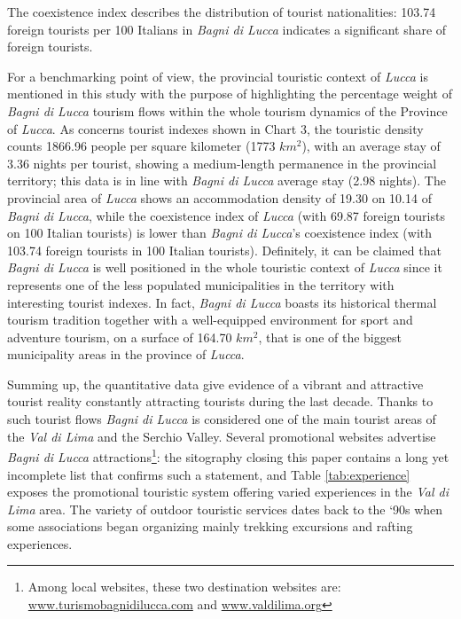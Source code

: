 \documentclass[sustainability,article,submit,pdftex,moreauthors]{Definitions/mdpi}
\begin{document}
The coexistence index describes the distribution of tourist nationalities: 103.74 foreign tourists per 100 Italians in \emph{Bagni di Lucca} indicates a significant share of foreign tourists.

For a benchmarking point of view, the provincial touristic context of \emph{Lucca} is mentioned in this study with the purpose of highlighting the percentage weight of \emph{Bagni di Lucca} tourism flows within the whole tourism dynamics of the Province of \emph{Lucca}. 
As concerns tourist indexes shown in Chart 3, the touristic density counts 1866.96 people per square kilometer (1773 $km^2$), with an average stay of 3.36 nights per tourist, showing a medium-length permanence in the provincial territory; this data is in line with \emph{Bagni di Lucca} average stay (2.98 nights). 
The provincial area of \emph{Lucca} shows an accommodation density of 19.30 on 10.14 of \emph{Bagni di Lucca}, while the coexistence index of \emph{Lucca} (with 69.87 foreign tourists on 100 Italian tourists) is lower than \emph{Bagni di Lucca}’s coexistence index (with 103.74 foreign tourists in 100 Italian tourists). 
Definitely, it can be claimed that \emph{Bagni di Lucca} is well positioned in the whole touristic context of \emph{Lucca} since it represents one of the less populated municipalities in the territory with interesting tourist indexes. In fact, \emph{Bagni di Lucca} boasts its historical thermal tourism tradition together with a well-equipped environment for sport and adventure tourism, on a surface of 164.70 $km^2$, that is one of the biggest municipality areas in the province of \emph{Lucca}.

Summing up, the quantitative data give evidence of a vibrant and attractive tourist reality constantly attracting tourists during the last decade. Thanks to such tourist flows \emph{Bagni di Lucca} is considered one of the main tourist areas of the \emph{Val di Lima} and the Serchio Valley. Several promotional websites advertise \emph{Bagni di Lucca} attractions\footnote{Among local websites, these two destination websites are: \url{www.turismobagnidilucca.com} and \url{www.valdilima.org}}: the sitography closing this paper contains a long yet incomplete list that confirms such a statement, and Table \ref{tab:experience} exposes the promotional touristic system offering varied experiences in the \emph{Val di Lima} area. The variety of outdoor touristic services dates back to the ‘90s when some associations began organizing mainly trekking excursions and rafting experiences.
\end{document}
